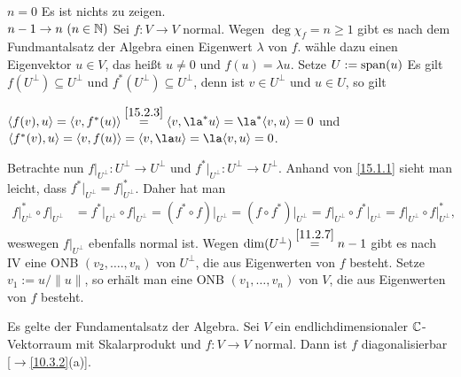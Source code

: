 \documentclass[../../main.tex]{subfiles}
\begin{document}
\begin{cproof}
\underline{$n=0$} Es ist nichts zu zeigen.\\
\underline{$n-1\to n\ (n\in \mathbb N)$} Sei $f: V\to V$ normal. Wegen $\deg \chi_f=n\ge 1$ gibt es nach dem Fundmantalsatz der Algebra einen Eigenwert $\lambda$ von $f$. wähle dazu einen Eigenvektor $u\in V$, das heißt $u\neq 0$ und $f(u)=\lambda u$. Setze $U:=\operatorname{span}(u)$ Es gilt $f(U^\perp)\subseteq U^\perp$ und $f^*(U^\perp)\subseteq U^\perp$, denn ist $v\in U^\perp$ und $u\in U$, so gilt
\begin{center}
$\scal{f(v),u}=\scal{v,f^*(u)}\stackrel{\ref{15.2.3}}{=}\scal{v,\la^*u}=\la^*\scal{v,u}=0$ und\\
$\scal{f^*(v),u}=\scal{v,f(u)}=\scal{v,\la u}=\la\scal{v,u}=0$.
\end{center}
Betrachte nun $f\vert_{U^\perp}: U^{\perp}\to U^{\perp}$ und $f^*\vert_{U^\perp}: U^{\perp}\to U^{\perp}$. Anhand von \ref{15.1.1} sieht man leicht, dass $f^*\vert_{U^\perp}=f\vert^*_{U^\perp}$. Daher hat man
\begin{align*}
f\vert_{U^\perp}^*\circ f\vert_{U^\perp}&=f^*\vert_{U^\perp}\circ f\vert_{U^\perp}=(f^*\circ f)\vert_{U^\perp}=(f\circ f^*)\vert_{U^\perp}=f\vert_{U^\perp}\circ f^*\vert_{U^\perp}=f\vert_{U^\perp}\circ f\vert_{U^\perp}^*,
\end{align*}
weswegen $f\vert_{U^\perp}$ ebenfalls normal ist. Wegen $\dim(U^\perp)\stackrel{\ref{11.2.7}}{=}n-1$ gibt es nach IV eine ONB $(v_2,\ldots .,v_n)$ von $U^\perp$, die aus Eigenwerten von $f$ besteht. Setze $v_1:=u/\|u\|$, so erhält man eine ONB $(v_1,\ldots ,v_n)$ von $V$, die aus Eigenwerten von $f$ besteht.
\end{cproof}

\begin{kor}\label{15.2.5}
Es gelte der Fundamentalsatz der Algebra. Sei $V$ ein endlichdimensionaler $\mathbb C$-Vektorraum mit Skalarprodukt und $f: V\to V$ normal. Dann ist $f$ diagonalisierbar [$\to$\ref{10.3.2}(a)].
\end{kor}
\end{document}
